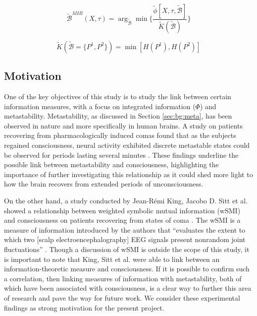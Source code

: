 \documentclass[a4paper,11pt]{article}
\begin{document}
\begin{equation}
\label{eq:mib-tilde}
\widetilde{\mathcal{B}}^{MIB}(X, \tau) = \arg_{\widetilde{\mathcal{B}}} \min \Big\lbrace \frac{\tilde{\phi} [X, \tau, \widetilde{\mathcal{B}}]}{\widetilde{K}(\widetilde{\mathcal{B}})} \Big\rbrace
\end{equation}

\begin{equation}
\label{eq:norm-tilde}
\widetilde{K}(\widetilde{\mathcal{B}} = \lbrace P^1, P^2 \rbrace) = \min[H(P^1), H(P^2)]
\end{equation}

\subsection{Motivation}
\label{sec:bg:motivation}
One of the key objectives of this study is to study the link between certain information measures, with a focus on integrated information ($\Phi$) and metastability. Metastability, as discussed in Section \ref{sec:bg:meta}, has been observed in nature and more specifically in human brains. A study on patients recovering from pharmacologically induced comas found that as the subjects regained consciousness, neural activity exhibited discrete metastable states could be observed for periods lasting several minutes \cite{Hudson2014}. These findings underline the possible link between metastability and consciousness, highlighting the importance of further investigating this relationship as it could shed more light to how the brain recovers from extended periods of unconsciousness.

On the other hand, a study conducted by Jean-R\'{e}mi King, Jacobo D. Sitt et al. showed a relationship between weighted symbolic mutual information (wSMI) and consciousness on patients recovering from states of coma \cite{King2013}. The wSMI is a measure of information introduced by the authors that ``evaluates the extent to which two [scalp electroencephalography] EEG signals present nonrandom joint fluctuations'' \cite{King2013}. Though a discussion of wSMI is outside the scope of this study, it is important to note that King, Sitt et al. were able to link between an information-theoretic measure and consciousness. If it is possible to confirm such a correlation, then linking measures of information with metastability, both of which have been associated with consciousness, is a clear way to further this area of research and pave the way for future work. We consider these experimental findings as strong motivation for the present project.
\end{document}
